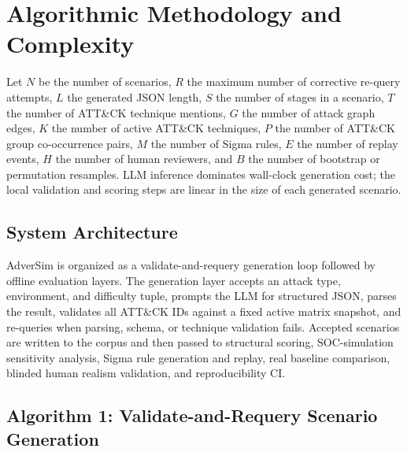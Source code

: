 
\section{Algorithmic Methodology and Complexity}

Let $N$ be the number of scenarios, $R$ the maximum number of corrective
re-query attempts, $L$ the generated JSON length, $S$ the number of stages in a
scenario, $T$ the number of ATT\&CK technique mentions, $G$ the number of attack
graph edges, $K$ the number of active ATT\&CK techniques, $P$ the number of
ATT\&CK group co-occurrence pairs, $M$ the number of Sigma rules, $E$ the number
of replay events, $H$ the number of human reviewers, and $B$ the number of
bootstrap or permutation resamples. LLM inference dominates wall-clock
generation cost; the local validation and scoring steps are linear in the size
of each generated scenario.

\subsection{System Architecture}

AdverSim is organized as a validate-and-requery generation loop followed by
offline evaluation layers. The generation layer accepts an attack type,
environment, and difficulty tuple, prompts the LLM for structured JSON, parses
the result, validates all ATT\&CK IDs against a fixed active matrix snapshot,
and re-queries when parsing, schema, or technique validation fails. Accepted
scenarios are written to the corpus and then passed to structural scoring,
SOC-simulation sensitivity analysis, Sigma rule generation and replay, real
baseline comparison, blinded human realism validation, and reproducibility CI.

\subsection{Algorithm 1: Validate-and-Requery Scenario Generation}

